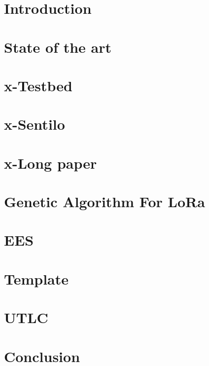 


\def\printbib{\printbibliography}%




\begin{refsection}
\preface
\body



\chapter[01]{Introduction}
\chapter[02]{State of the art}
\chapter[03]{x-Testbed}
\chapter[04]{x-Sentilo}
\chapter[05]{x-Long paper}
\chapter[06]{Genetic Algorithm For LoRa}%
\chapter[21]{EES}%
\chapter[07]{Template}
\chapter[08]{UTLC}
\chapter[09]{Conclusion}
\Appendix

\end{refsection}
